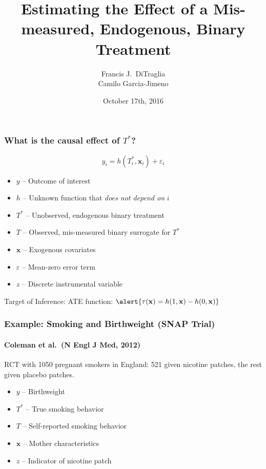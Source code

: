 \documentclass{beamer}
\title[Binary Regressors]{Estimating the Effect of a Mis-measured, Endogenous, Binary Treatment}
\author[FJ DiTraglia]{Francis J.\ DiTraglia\\ Camilo Garcia-Jimeno}
\institute{University of Pennsylvania}
\date{October 17th, 2016}
\begin{document}
 

\begin{frame}[plain]
	\titlepage 
\end{frame} 
\begin{frame}
  \frametitle{What is the causal effect of $T^*$?}
  \vspace{-1em}
  \[ y_i = h(T^*_i, \mathbf{x}_i) + \varepsilon_i\]
  \vspace{-1.5em}
  \begin{itemize}
    \item $y$ -- Outcome of interest
    \item $h$ -- Unknown function that \emph{does not depend on} $i$
    \item $T^*$ -- Unobserved, endogenous binary treatment
    \item $T$ -- Observed, mis-measured binary surrogate for $T^*$
    \item $\mathbf{x}$ -- Exogenous covariates
    \item $\varepsilon$ -- Mean-zero error term
    \item $z$ -- Discrete instrumental variable
  \end{itemize}

 \begin{block}{Target of Inference:}
   ATE function:  $\alert{\tau(\mathbf{x}) = h(1,\mathbf{x}) - h(0,\mathbf{x})}$
  \end{block}
\end{frame}
\begin{frame}
  \frametitle{Example: Smoking and Birthweight (SNAP Trial)}
\framesubtitle{Coleman et al.\ (N Engl J Med, 2012)}
  RCT with 1050 pregnant smokers in England: 521 given nicotine patches, the rest given placebo patches.
\begin{itemize}
  \item $y$ -- Birthweight 
  \item $T^*$ -- True smoking behavior 
  \item $T$ -- Self-reported smoking behavior
  \item $\mathbf{x}$ -- Mother characteristics
  \item $z$ -- Indicator of nicotine patch
\end{itemize}
   
\end{frame}
\end{document}
